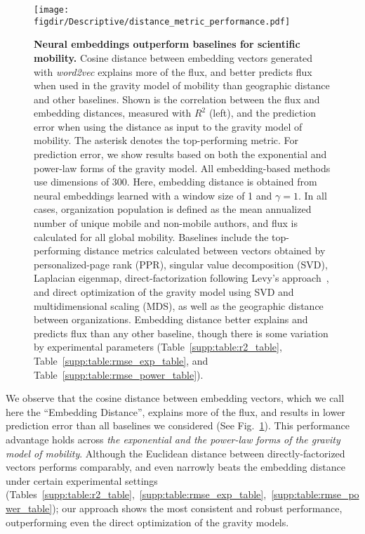 \documentclass[12pt,a4paper]{article}
\def\figdir{../Figs}
\newcommand{\mycaption}[2]{%
  \caption[#1]{\textbf{#1} \small#2}%
}
\begin{document}
%
%
\begin{figure}[ht!]
	\centering
	\texttt{[image: \\figdir/Descriptive/distance\_metric\_performance.pdf]}
	\mycaption
	{Neural embeddings outperform baselines for scientific mobility.}
	{
		Cosine distance between embedding vectors generated with \textit{word2vec} explains more of the flux, and better predicts flux when used in the gravity model of mobility than geographic distance and other baselines.
		Shown is the correlation between the flux and embedding distances, measured with $R^{2}$ (left), and the prediction error when using the distance as input to the gravity model of mobility.
		The asterisk denotes the top-performing metric.
		For prediction error, we show results based on both the exponential and power-law forms of the gravity model.
		All embedding-based methods use dimensions of 300.
		Here, embedding distance is obtained from neural embeddings learned with a window size of 1 and $\gamma = 1$.
		In all cases, organization population is defined as the mean annualized number of unique mobile and non-mobile authors, and flux is calculated for all global mobility.
		Baselines include the top-performing distance metrics calculated between vectors obtained by personalized-page rank (PPR), singular value decomposition (SVD), Laplacian eigenmap, direct-factorization following Levy's approach~\autocite{levy2014neural}, and direct optimization of the gravity model using SVD and multidimensional scaling (MDS), as well as the geographic distance between organizations.
		Embedding distance better explains and predicts flux than any other baseline, though there is some variation by experimental parameters (Table~\ref{supp:table:r2_table}, Table~\ref{supp:table:rmse_exp_table}, and Table~\ref{supp:table:rmse_power_table}).
	}
	\label{fig:supp:distancemetrics}
\end{figure}



We observe that the cosine distance between embedding vectors, which we call here the ``Embedding Distance'', explains more of the flux, and results in lower prediction error than all baselines we considered (See Fig.~\ref{fig:supp:distancemetrics}).
This performance advantage holds across \emph{the exponential and the power-law forms of the gravity model of mobility}.
Although the Euclidean distance between directly-factorized vectors performs comparably, and even narrowly beats the embedding distance under certain experimental settings (Tables~\ref{supp:table:r2_table},~\ref{supp:table:rmse_exp_table},~\ref{supp:table:rmse_power_table}); our approach shows the most consistent and robust performance, outperforming even the direct optimization of the gravity models.
\end{document}
